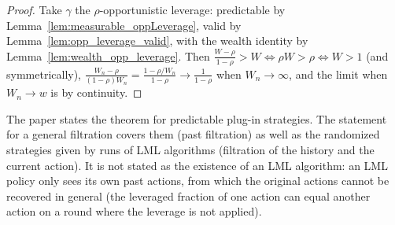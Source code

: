 \begin{proof}
  \leanok
  Take $\gamma$ the $\rho$-opportunistic leverage: predictable by
  Lemma~\ref{lem:measurable_oppLeverage}, valid by Lemma~\ref{lem:opp_leverage_valid}, with the
  wealth identity by Lemma~\ref{lem:wealth_opp_leverage}. Then
  $\frac{W - \rho}{1-\rho} > W \iff \rho W > \rho \iff W > 1$ (and symmetrically),
  $\frac{W_n - \rho}{(1-\rho)W_n} = \frac{1 - \rho/W_n}{1-\rho} \to \frac{1}{1-\rho}$ when
  $W_n \to \infty$, and the limit when $W_n \to w$ is by continuity.
\end{proof}

\begin{remark}
  The paper states the theorem for predictable plug-in strategies. The statement for a general
  filtration covers them (past filtration) as well as the randomized strategies given by runs of
  LML algorithms (filtration of the history and the current action). It is not stated as the
  existence of an LML algorithm: an LML policy only sees its own past actions, from which the
  original actions cannot be recovered in general (the leveraged fraction of one action can equal
  another action on a round where the leverage is not applied).
\end{remark}
